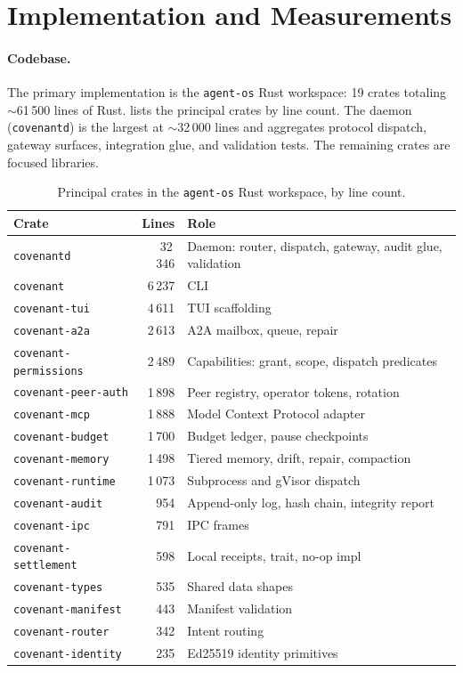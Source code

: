 \documentclass[11pt]{article}
\theoremstyle{plainsmall}
\begin{document}
\section{Implementation and Measurements}
\label{sec:impl}

\paragraph{Codebase.} The primary implementation is the \texttt{agent-os} Rust workspace: 19 crates totaling $\sim$61\,500 lines of Rust.  lists the principal crates by line count. The daemon (\texttt{covenantd}) is the largest at $\sim$32\,000 lines and aggregates protocol dispatch, gateway surfaces, integration glue, and validation tests. The remaining crates are focused libraries.

\begin{table}[h]
\centering
\caption{Principal crates in the \texttt{agent-os} Rust workspace, by line count.}
\label{tab:crates}
\small
\begin{tabular}{@{}lr l@{}}
\toprule
Crate & Lines & Role \\
\midrule
\texttt{covenantd}            & 32\,346 & Daemon: router, dispatch, gateway, audit glue, validation \\
\texttt{covenant}             &  6\,237 & CLI \\
\texttt{covenant-tui}         &  4\,611 & TUI scaffolding \\
\texttt{covenant-a2a}         &  2\,613 & A2A mailbox, queue, repair \\
\texttt{covenant-permissions} &  2\,489 & Capabilities: grant, scope, dispatch predicates \\
\texttt{covenant-peer-auth}   &  1\,898 & Peer registry, operator tokens, rotation \\
\texttt{covenant-mcp}         &  1\,888 & Model Context Protocol adapter \\
\texttt{covenant-budget}      &  1\,700 & Budget ledger, pause checkpoints \\
\texttt{covenant-memory}      &  1\,498 & Tiered memory, drift, repair, compaction \\
\texttt{covenant-runtime}     &  1\,073 & Subprocess and gVisor dispatch \\
\texttt{covenant-audit}       &     954 & Append-only log, hash chain, integrity report \\
\texttt{covenant-ipc}         &     791 & IPC frames \\
\texttt{covenant-settlement}  &     598 & Local receipts, trait, no-op impl \\
\texttt{covenant-types}       &     535 & Shared data shapes \\
\texttt{covenant-manifest}    &     443 & Manifest validation \\
\texttt{covenant-router}      &     342 & Intent routing \\
\texttt{covenant-identity}    &     235 & Ed25519 identity primitives \\
\bottomrule
\end{tabular}
\end{table}
\end{document}
